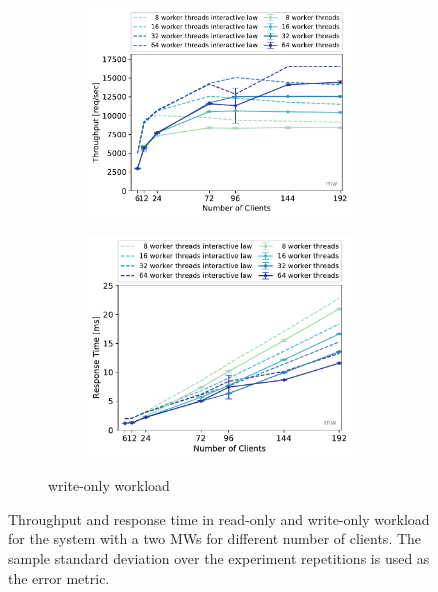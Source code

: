 \documentclass[report.tex]{subfiles}
\begin{document}
\begin{figure}[H]
\begin{subfigure}{\linewidth}
\end{subfigure}
\\[1ex]
\begin{subfigure}{\linewidth}
	\begin{subfigure}[b]{.49\linewidth}
		\centering
		\includegraphics[width=\linewidth]{data/exp32_wo_tp_nc_w.pdf}
	\end{subfigure}\hfill
	\begin{subfigure}[b]{.49\linewidth}
		\centering
		\includegraphics[width=\linewidth]{data/exp32_wo_rt_nc_w.pdf}
	\end{subfigure}%
	\caption{write-only workload}\label{exp32_wo_tp_nc}
\end{subfigure}
\caption{Throughput and response time in read-only and write-only workload for the system with a two MWs for different number of clients. The sample standard deviation over the experiment repetitions is used as the error metric.}
\end{figure}
\end{document}
